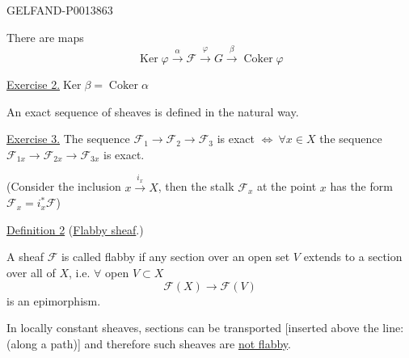 \begin{GelfandAdjacentEvidence}{GELFAND-P001386}{3}



There are maps
\[
\operatorname{Ker}\varphi\overset{\alpha}{\longrightarrow}\mathcal F
\overset{\varphi}{\longrightarrow}G
\overset{\beta}{\longrightarrow}\operatorname{Coker}\varphi
\]

\uline{Exercise 2.}\quad \(\operatorname{Ker}\beta=\operatorname{Coker}\alpha\)

An exact sequence of sheaves is defined in the natural way.

\uline{Exercise 3.}\quad
The sequence \(\mathcal F_1\longrightarrow\mathcal F_2\longrightarrow\mathcal F_3\)
is exact \(\Longleftrightarrow\ \forall x\in X\)
the sequence \(\mathcal F_{1x}\longrightarrow\mathcal F_{2x}\longrightarrow\mathcal F_{3x}\)
is exact.

(Consider the inclusion \(x\overset{i_x}{\longrightarrow}X\), then the stalk
\(\mathcal F_x\) at the point \(x\) has the form \(\mathcal F_x=i_x^*\mathcal F\))

\uline{Definition 2} (\uline{Flabby sheaf}.)

A sheaf \(\mathcal F\) is called flabby if any section over an open set \(V\) extends to a section over all of \(X\),
i.e. \(\forall\) open \(V\subset X\)
\[
\mathcal F(X)\longrightarrow\mathcal F(V)
\]
is an epimorphism.

\end{GelfandAdjacentEvidence}


In locally constant sheaves, sections can be transported [inserted above the line: (along a path)] and therefore such sheaves are \uline{not flabby}.

